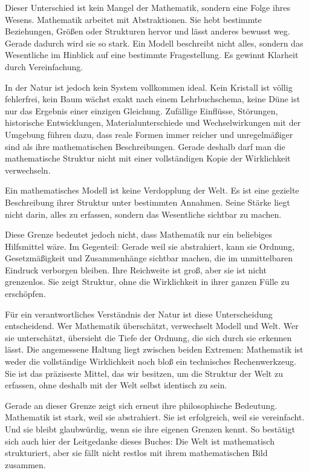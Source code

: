 Dieser Unterschied ist kein Mangel der Mathematik,
sondern eine Folge ihres Wesens.
Mathematik arbeitet mit Abstraktionen.
Sie hebt bestimmte Beziehungen,
Größen
oder Strukturen hervor
und lässt anderes bewusst weg.
Gerade dadurch wird sie so stark.
Ein Modell beschreibt nicht alles,
sondern das Wesentliche im Hinblick auf eine bestimmte Fragestellung.
Es gewinnt Klarheit durch Vereinfachung.

In der Natur ist jedoch kein System vollkommen ideal.
Kein Kristall ist völlig fehlerfrei,
kein Baum wächst exakt nach einem Lehrbuchschema,
keine Düne ist nur das Ergebnis einer einzigen Gleichung.
Zufällige Einflüsse,
Störungen,
historische Entwicklungen,
Materialunterschiede
und Wechselwirkungen mit der Umgebung führen dazu,
dass reale Formen immer reicher und unregelmäßiger sind als ihre mathematischen Beschreibungen.
Gerade deshalb darf man die mathematische Struktur nicht mit einer vollständigen Kopie der Wirklichkeit verwechseln.

\begin{DidacticBox}
	Ein mathematisches Modell ist keine Verdopplung der Welt.
	Es ist eine gezielte Beschreibung ihrer Struktur unter bestimmten Annahmen.
	Seine Stärke liegt nicht darin,
	alles zu erfassen,
	sondern das Wesentliche sichtbar zu machen.
\end{DidacticBox}

Diese Grenze bedeutet jedoch nicht,
dass Mathematik nur ein beliebiges Hilfsmittel wäre.
Im Gegenteil:
Gerade weil sie abstrahiert,
kann sie Ordnung,
Gesetzmäßigkeit
und Zusammenhänge sichtbar machen,
die im unmittelbaren Eindruck verborgen bleiben.
Ihre Reichweite ist groß,
aber sie ist nicht grenzenlos.
Sie zeigt Struktur,
ohne die Wirklichkeit in ihrer ganzen Fülle zu erschöpfen.

Für ein verantwortliches Verständnis der Natur ist diese Unterscheidung entscheidend.
Wer Mathematik überschätzt,
verwechselt Modell und Welt.
Wer sie unterschätzt,
übersieht die Tiefe der Ordnung,
die sich durch sie erkennen lässt.
Die angemessene Haltung liegt zwischen beiden Extremen:
Mathematik ist weder die vollständige Wirklichkeit
noch bloß ein technisches Rechenwerkzeug.
Sie ist das präziseste Mittel,
das wir besitzen,
um die Struktur der Welt zu erfassen,
ohne deshalb mit der Welt selbst identisch zu sein.

Gerade an dieser Grenze zeigt sich erneut ihre philosophische Bedeutung.
Mathematik ist stark,
weil sie abstrahiert.
Sie ist erfolgreich,
weil sie vereinfacht.
Und sie bleibt glaubwürdig,
wenn sie ihre eigenen Grenzen kennt.
So bestätigt sich auch hier der Leitgedanke dieses Buches:
Die Welt ist mathematisch strukturiert,
aber sie fällt nicht restlos mit ihrem mathematischen Bild zusammen.

